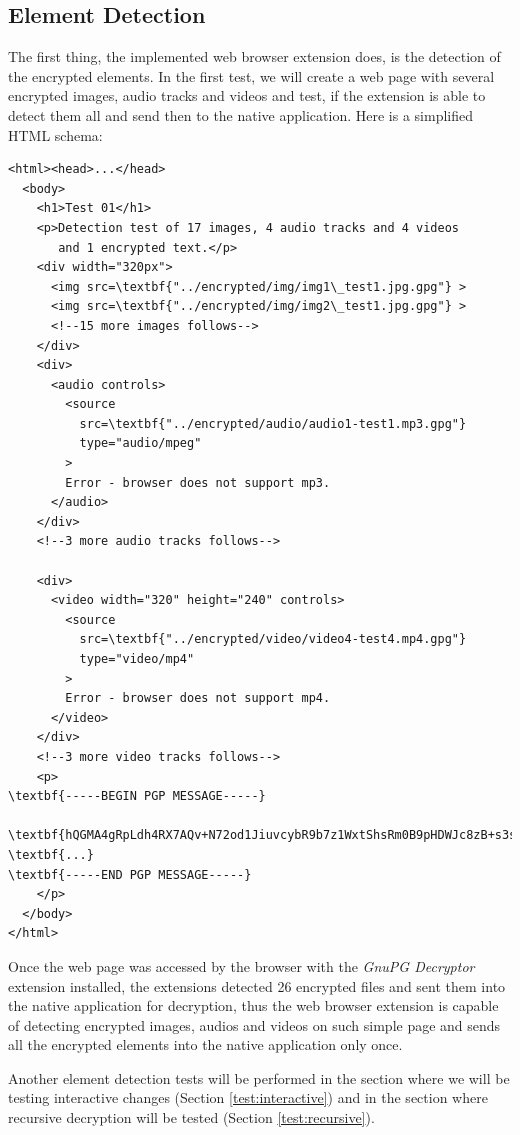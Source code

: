 \subsection{Element Detection}
\label{test:detection}
The first thing, the implemented web browser extension does, is the detection of the encrypted elements. In the first test, we will create a web page with several encrypted images, audio tracks and videos and test, if the extension is able to detect them all and send then to the native application. Here is a simplified HTML schema:

\begin{Verbatim}[commandchars=\\\{\},codes={\catcode`$=3\catcode`_=8},samepage=false,frame=single]
<html><head>...</head>
  <body>
    <h1>Test 01</h1>
    <p>Detection test of 17 images, 4 audio tracks and 4 videos
       and 1 encrypted text.</p>
    <div width="320px">
      <img src=\textbf{"../encrypted/img/img1\_test1.jpg.gpg"} >
      <img src=\textbf{"../encrypted/img/img2\_test1.jpg.gpg"} >
      <!--15 more images follows-->
    </div>
    <div>
      <audio controls>
        <source
          src=\textbf{"../encrypted/audio/audio1-test1.mp3.gpg"}
          type="audio/mpeg"
        >
        Error - browser does not support mp3.
      </audio>
    </div>
    <!--3 more audio tracks follows-->

    <div>
      <video width="320" height="240" controls>
        <source
          src=\textbf{"../encrypted/video/video4-test4.mp4.gpg"}
          type="video/mp4"
        >
        Error - browser does not support mp4.
      </video>
    </div>
    <!--3 more video tracks follows-->
    <p>
\textbf{-----BEGIN PGP MESSAGE-----}

\textbf{hQGMA4gRpLdh4RX7AQv+N72od1JiuvcybR9b7z1WxtShsRm0B9pHDWJc8zB+s3sk}
\textbf{...}
\textbf{-----END PGP MESSAGE-----}
    </p>
  </body>
</html>
\end{Verbatim}

Once the web page was accessed by the browser with the \textit{GnuPG Decryptor} extension installed, the extensions detected 26 encrypted files and sent them into the native application for decryption, thus the web browser extension is capable of detecting encrypted images, audios and videos on such simple page and sends all the encrypted elements into the native application only once.

Another element detection tests will be performed in the section where we will be testing interactive changes (Section \ref{test:interactive}) and in the section where recursive decryption will be tested (Section \ref{test:recursive}).

